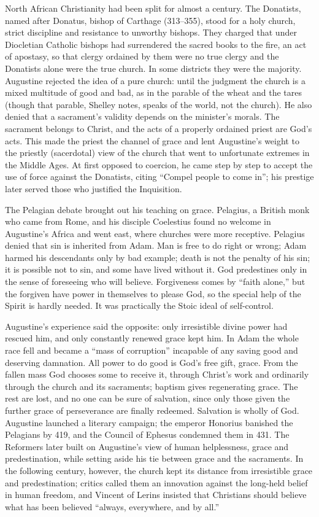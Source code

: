 North African Christianity had been split for almost a century. The Donatists, named after Donatus,
bishop of Carthage (313--355), stood for a holy church, strict discipline and resistance to unworthy
bishops. They charged that under Diocletian Catholic bishops had surrendered the sacred books to the fire, an act of apostasy, so that clergy ordained by them were no true clergy and the Donatists
alone were the true church. In some districts they were the majority. Augustine rejected the idea of
a pure church: until the judgment the church is a mixed multitude of good and bad, as in the parable
of the wheat and the tares (though that parable, Shelley notes, speaks of the world, not the church).
He also denied that a sacrament's validity depends on the minister's morals. The sacrament belongs to
Christ, and the acts of a properly ordained priest are God's acts. This made the priest the channel of
grace and lent Augustine's weight to the priestly (sacerdotal) view of the church that went to
unfortunate extremes in the Middle Ages. At first opposed to coercion, he came step by step to accept
the use of force against the Donatists, citing ``Compel people to come in''; his prestige later served
those who justified the Inquisition.

The Pelagian debate brought out his teaching on grace. Pelagius, a British monk who came from Rome,
and his disciple Coelestius found no welcome in Augustine's Africa and went east, where churches were
more receptive. Pelagius denied that sin is inherited from Adam. Man is free to do right or wrong;
Adam harmed his descendants only by bad example; death is not the penalty of his sin; it is possible
not to sin, and some have lived without it. God predestines only in the sense of foreseeing who will
believe. Forgiveness comes by ``faith alone,'' but the forgiven have power in themselves to please
God, so the special help of the Spirit is hardly needed. It was practically the Stoic ideal of
self-control.

Augustine's experience said the opposite: only irresistible divine power had rescued him, and only
constantly renewed grace kept him. In Adam the whole race fell and became a ``mass of corruption''
incapable of any saving good and deserving damnation. All power to do good is God's free gift, grace.
From the fallen mass God chooses some to receive it, through Christ's work and ordinarily through the
church and its sacraments; baptism gives regenerating grace. The rest are lost, and no one can be sure
of salvation, since only those given the further grace of perseverance are finally redeemed. Salvation
is wholly of God. Augustine launched a literary campaign; the emperor Honorius banished the Pelagians
by 419, and the Council of Ephesus condemned them in 431. The Reformers later built on Augustine's
view of human helplessness, grace and predestination, while setting aside his tie between grace and
the sacraments. In the following century, however, the church kept its distance from irresistible
grace and predestination; critics called them an innovation against the long-held belief in human
freedom, and Vincent of Lerins insisted that Christians should believe what has been believed
``always, everywhere, and by all.''

